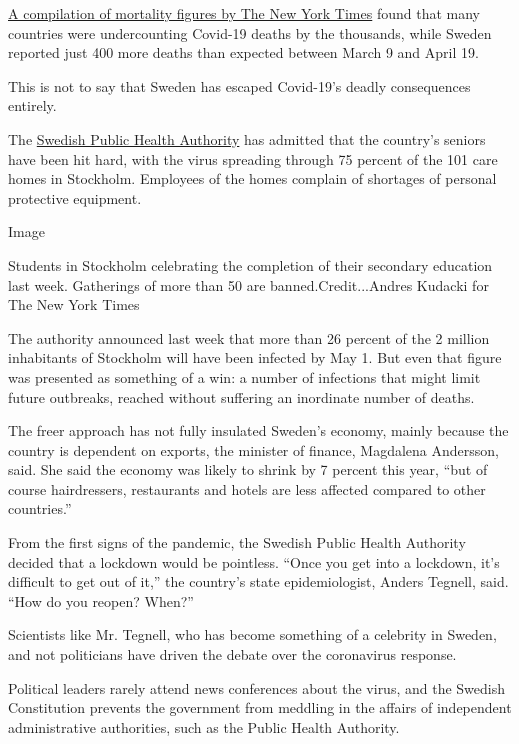 \href{https://www.nytimes3xbfgragh.onion/interactive/2020/04/21/world/coronavirus-missing-deaths.html}{A
compilation of mortality figures by The New York Times} found that many
countries were undercounting Covid-19 deaths by the thousands, while
Sweden reported just 400 more deaths than expected between March 9 and
April 19.

This is not to say that Sweden has escaped Covid-19's deadly
consequences entirely.

The
\href{https://www.folkhalsomyndigheten.se/smittskydd-beredskap/utbrott/aktuella-utbrott/covid-19/}{Swedish
Public Health Authority} has admitted that the country's seniors have
been hit hard, with the virus spreading through 75 percent of the 101
care homes in Stockholm. Employees of the homes complain of shortages of
personal protective equipment.

Image

Students in Stockholm celebrating the completion of their secondary
education last week. Gatherings of more than 50 are
banned.Credit...Andres Kudacki for The New York Times

The authority announced last week that more than 26 percent of the 2
million inhabitants of Stockholm will have been infected by May 1. But
even that figure was presented as something of a win: a number of
infections that might limit future outbreaks, reached without suffering
an inordinate number of deaths.

The freer approach has not fully insulated Sweden's economy, mainly
because the country is dependent on exports, the minister of finance,
Magdalena Andersson, said. She said the economy was likely to shrink by
7 percent this year, ``but of course hairdressers, restaurants and
hotels are less affected compared to other countries.''

From the first signs of the pandemic, the Swedish Public Health
Authority decided that a lockdown would be pointless. ``Once you get
into a lockdown, it's difficult to get out of it,'' the country's state
epidemiologist, Anders Tegnell, said. ``How do you reopen? When?''

Scientists like Mr. Tegnell, who has become something of a celebrity in
Sweden, and not politicians have driven the debate over the coronavirus
response.

Political leaders rarely attend news conferences about the virus, and
the Swedish Constitution prevents the government from meddling in the
affairs of independent administrative authorities, such as the Public
Health Authority.

